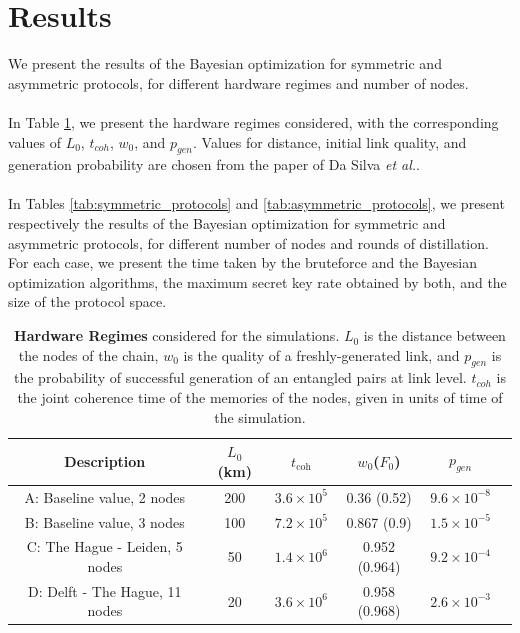 \documentclass{article}
\begin{document}
\clearpage
\section*{Results}

We present the results of the Bayesian optimization for symmetric and asymmetric protocols, for different hardware regimes and number of nodes.
\\\\
In Table \ref{tab:hardware_regimes}, we present the hardware regimes considered, with the corresponding values of $L_0$, $t_{coh}$, $w_0$, and $p_{gen}$. Values for distance, initial link quality, and generation probability are chosen from the paper of Da Silva \textit{et al.}.
\\\\
In Tables \ref{tab:symmetric_protocols} and \ref{tab:asymmetric_protocols}, we present respectively the results of the Bayesian optimization for symmetric and asymmetric protocols, for different number of nodes and rounds of distillation. For each case, we present the time taken by the bruteforce and the Bayesian optimization algorithms, the maximum secret key rate obtained by both, and the size of the protocol space.

\begin{table}[ht]
    \centering
    \begin{tabular}{|c|c|c|c|c|c|}
        \hline
        Description & $L_0$ (km) & $t_{\text{coh}}$ & $w_0$($F_0$) & $p_{gen}$ \\
        \hline
        \hline
        A: Baseline value, 2 nodes & 200  & $3.6 \times 10^5$ & 0.36 (0.52) & $9.6 \times 10^{-8}$ \\
        \hline
        B: Baseline value, 3 nodes & 100  & $7.2 \times 10^5$ & 0.867 (0.9) & $1.5 \times 10^{-5}$ \\
        \hline
        C: The Hague - Leiden, 5 nodes & 50  & $1.4 \times 10^6$ & 0.952 (0.964) & $9.2 \times 10^{-4}$ \\
        \hline
        D: Delft - The Hague, 11 nodes & 20  & $3.6 \times 10^6$ & 0.958 (0.968) & $2.6 \times 10^{-3}$ \\
        \hline
    \end{tabular}
    \caption{\textbf{Hardware Regimes} considered for the simulations. $L_0$ is the distance between the nodes of the chain, $w_0$ is the quality of a freshly-generated link, and $p_{gen}$ is the probability of successful generation of an entangled pairs at link level. $t_{coh}$ is the joint coherence time of the memories of the nodes, given in units of time of the simulation.}
    \label{tab:hardware_regimes}
\end{table}
\end{document}
